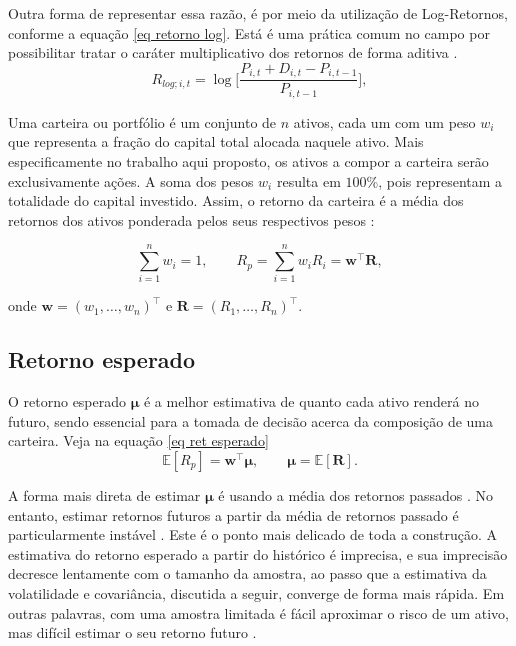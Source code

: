 \documentclass[12pt,a4paper]{article}
\begin{document}
Outra forma de representar essa razão, é por meio da utilização de Log-Retornos, conforme a equação \ref{eq retorno log}. Está é uma prática comum no campo por possibilitar tratar o caráter multiplicativo dos retornos de forma aditiva \cite{barrosa2015aplicacao}.
\begin{equation}
\label{eq retorno log}
R_{log; i,t} = \log\bigg[\frac{P_{i,t} + D_{i,t} - P_{i,t-1}}{P_{i,t-1}}\bigg],
\end{equation}

Uma carteira ou portfólio é um conjunto de $n$ ativos, cada um com um peso $w_i$ que representa a fração do capital total alocada naquele ativo. Mais especificamente no trabalho aqui proposto, os ativos a compor a carteira serão exclusivamente ações. A soma dos pesos $w_i$ resulta em $100\%$, pois representam a totalidade do capital investido. Assim, o retorno da carteira é a média dos retornos dos ativos ponderada pelos seus respectivos pesos \cite{fabozzi2008portfolio}:

\begin{equation}
\sum_{i=1}^{n} w_i = 1, \qquad    R_p = \sum_{i=1}^{n} w_i R_i = \mathbf{w}^\top \mathbf{R},
\end{equation}

onde $\mathbf{w} = (w_1, \dots, w_n)^\top$ e $\mathbf{R} = (R_1, \dots, R_n)^\top$. 


\subsection{Retorno esperado}
\label{sec: retorno esperado}

O retorno esperado $\boldsymbol{\mu}$ é a melhor estimativa de quanto cada ativo renderá no futuro, sendo essencial para a tomada de decisão acerca da composição de uma carteira. Veja na equação \ref{eq ret esperado}
\begin{equation}
\label{eq ret esperado}
\mathbb{E}[R_p] = \mathbf{w}^\top \boldsymbol{\mu}, \qquad \boldsymbol{\mu} = \mathbb{E}[\mathbf{R}].
\end{equation}

A forma mais direta de estimar $\boldsymbol{\mu}$ é usando a média dos retornos passados \cite{markowitz1952portfolio}. No entanto, estimar retornos futuros a partir da média de retornos passado é particularmente instável \cite{fisher1935design}. Este é o ponto mais delicado de toda a construção. A estimativa do retorno esperado a partir do histórico é imprecisa, e sua imprecisão decresce lentamente com o tamanho da amostra, ao passo que a estimativa da volatilidade e covariância, discutida a seguir, converge de forma mais rápida. Em outras palavras, com uma amostra limitada é fácil aproximar o risco de um ativo, mas difícil estimar o seu retorno futuro \cite{fisher1935design}. 
\end{document}
